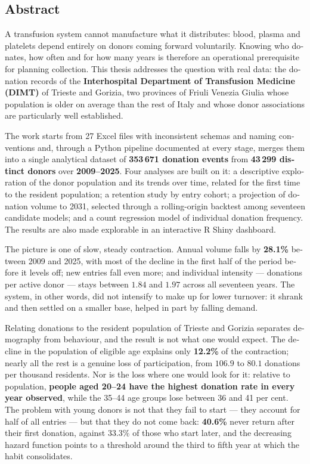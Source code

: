 \begin{otherlanguage}{english}
\chapter{Abstract}

A transfusion system cannot manufacture what it distributes: blood, plasma
and platelets depend entirely on donors coming forward voluntarily.
Knowing who donates, how often and for how many years is therefore an
operational prerequisite for planning collection.
This thesis addresses the question with real data:
the donation records of the \textbf{Interhospital Department of Transfusion
Medicine (DIMT)} of Trieste and Gorizia, two provinces of Friuli Venezia
Giulia whose population is older on average than the rest of Italy and whose
donor associations are particularly well established.

The work starts from 27 Excel files with inconsistent schemas and naming
conventions and, through a Python pipeline documented at every stage, merges
them into a single analytical dataset of \textbf{353\,671 donation events}
from \textbf{43\,299 distinct donors} over \textbf{2009--2025}. Four analyses
are built on it: a descriptive exploration of the donor population and its
trends over time, related for the first time to the resident population; a
retention study by entry cohort; a projection of donation volume to 2031,
selected through a rolling-origin backtest among seventeen candidate models; and
a count regression model of individual donation frequency. The results are
also made explorable in an interactive R Shiny dashboard.

The picture is one of slow, steady contraction. Annual volume falls by
\textbf{28.1\%} between 2009 and 2025, with most of the decline in the first
half of the period before it levels off; new entries fall even more; and
individual intensity --- donations per active donor --- stays between $1.84$
and $1.97$ across all seventeen years. The system, in other words, did not
intensify to make up for lower turnover: it shrank and then settled on a
smaller base, helped in part by falling demand.

Relating donations to the resident population of Trieste and Gorizia separates
demography from behaviour, and the result is not what one would expect. The
decline in the population of eligible age explains only \textbf{12.2\%} of the
contraction; nearly all the rest is a genuine loss of participation, from
$106.9$ to $80.1$ donations per thousand residents. Nor is the loss where one
would look for it: relative to population, \textbf{people aged 20--24 have the
highest donation rate in every year observed}, while the 35--44 age groups
lose between 36 and 41 per cent. The problem with young donors is not that
they fail to start --- they account for half of all entries --- but that they
do not come back: \textbf{40.6\%} never return after their first donation,
against $33.3\%$ of those who start later, and the decreasing hazard function
points to a threshold around the third to fifth year at which the habit
consolidates.


\end{otherlanguage}
